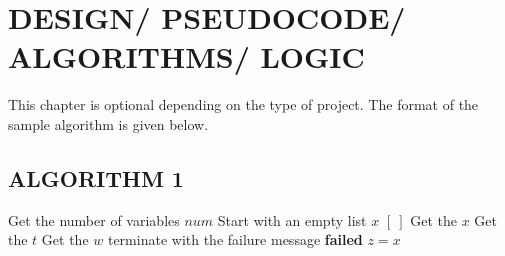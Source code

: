 
\chapter{\uppercase{Design/ Pseudocode/ Algorithms/ Logic}} %
\label{chap4} %
This chapter is optional depending on the type of project. The format of the sample algorithm is given below.

\section{\uppercase{Algorithm 1}}
\begin{algorithm}
\begin{algorithmic}[1]
\State Get the number of variables $num$ 
\State Start with an empty list $x$ $[~]$
	\State Get the $x$
	\State  Get the $t$
	\State Get the $w$
\EndFor 
{} 
	\State terminate with the failure message \textbf{failed}
\Else
	\State $z = x$
\EndIf 

\end{algorithmic}
\end{algorithm}



